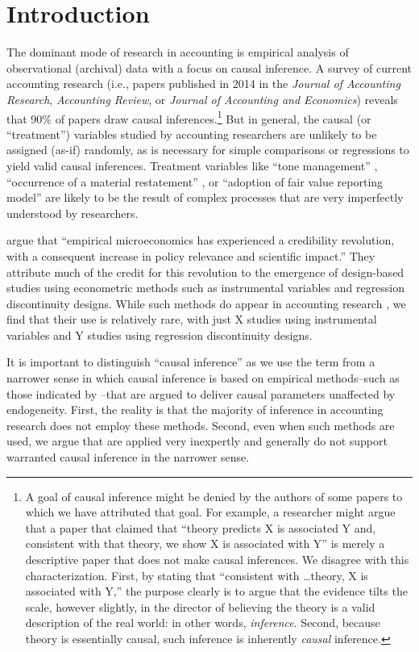 \section{Introduction}

The dominant mode of research in accounting is empirical analysis of observational (archival) data with a focus on causal inference. A survey of current accounting research (i.e., papers published in 2014 in the \textit{Journal of Accounting Research}, \textit{Accounting Review}, or \textit{Journal of Accounting and Economics}) reveals that 90\% of papers draw causal inferences.\footnote{A goal of causal inference might be denied by the authors of some papers to which we have attributed that goal. 
For example, a researcher might argue that a paper that claimed that ``theory predicts X is associated Y and, consistent with that theory, we show X is associated with Y'' is merely a descriptive paper that does not make causal inferences. 
We disagree with this characterization. 
First, by stating that ``consistent with \dots theory, X is associated with Y,'' the purpose clearly is to argue that the evidence tilts the scale, however slightly, in the director of believing the theory is a valid description of the real world: in other words, \emph{inference}. 
Second, because theory is essentially causal, such inference is inherently \emph{causal} inference.} 
But in general, the causal (or ``treatment'') variables studied by accounting researchers are unlikely to be assigned (as-if) randomly, as is necessary for simple comparisons or regressions to yield valid causal inferences. Treatment variables like ``tone management'' \citep{Huang:2014cs}, ``occurrence of a material restatement'' \citep{Chen:2014ji}, or ``adoption of fair value reporting model'' \citep{Liang:2014ea} are likely to be the result of complex processes that are very imperfectly understood by researchers.

\cite{Angrist:2010jv} argue that ``empirical microeconomics has experienced a credibility revolution, with a consequent increase in policy relevance and scientific impact.'' They attribute much of the credit for this revolution to the emergence of design-based studies using econometric methods such as instrumental variables and regression discontinuity designs. While such methods do appear in accounting research \citep{Larcker:2010fq}, we find that their use is relatively rare, with just X studies using instrumental variables and Y studies using regression discontinuity designs.

It is important to distinguish ``causal inference'' as we use the term from a narrower sense in which causal inference is based on empirical methods--such as those indicated by \cite{Angrist:2010jv}--that are argued to deliver causal parameters unaffected by endogeneity. First, the reality is that the majority of inference in accounting research does not employ these methods. Second, even when such methods are used, we argue that are applied very inexpertly and generally do not support warranted causal inference in the narrower sense.

